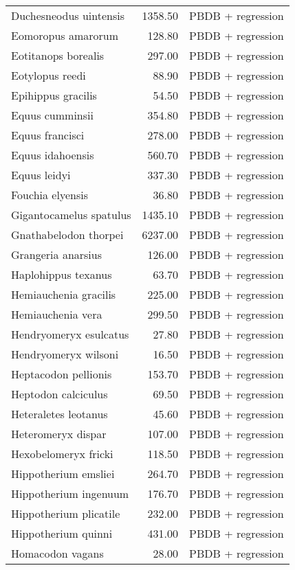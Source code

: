 \begin{table}[ht]
\begin{tabular}{lrl}
  Duchesneodus uintensis & 1358.50 & PBDB + regression \\ 
  Eomoropus amarorum & 128.80 & PBDB + regression \\ 
  Eotitanops borealis & 297.00 & PBDB + regression \\ 
  Eotylopus reedi & 88.90 & PBDB + regression \\ 
  Epihippus gracilis & 54.50 & PBDB + regression \\ 
  Equus cumminsii & 354.80 & PBDB + regression \\ 
  Equus francisci & 278.00 & PBDB + regression \\ 
  Equus idahoensis & 560.70 & PBDB + regression \\ 
  Equus leidyi & 337.30 & PBDB + regression \\ 
  Fouchia elyensis & 36.80 & PBDB + regression \\ 
  Gigantocamelus spatulus & 1435.10 & PBDB + regression \\ 
  Gnathabelodon thorpei & 6237.00 & PBDB + regression \\ 
  Grangeria anarsius & 126.00 & PBDB + regression \\ 
  Haplohippus texanus & 63.70 & PBDB + regression \\ 
  Hemiauchenia gracilis & 225.00 & PBDB + regression \\ 
  Hemiauchenia vera & 299.50 & PBDB + regression \\ 
  Hendryomeryx esulcatus & 27.80 & PBDB + regression \\ 
  Hendryomeryx wilsoni & 16.50 & PBDB + regression \\ 
  Heptacodon pellionis & 153.70 & PBDB + regression \\ 
  Heptodon calciculus & 69.50 & PBDB + regression \\ 
  Heteraletes leotanus & 45.60 & PBDB + regression \\ 
  Heteromeryx dispar & 107.00 & PBDB + regression \\ 
  Hexobelomeryx fricki & 118.50 & PBDB + regression \\ 
  Hippotherium emsliei & 264.70 & PBDB + regression \\ 
  Hippotherium ingenuum & 176.70 & PBDB + regression \\ 
  Hippotherium plicatile & 232.00 & PBDB + regression \\ 
  Hippotherium quinni & 431.00 & PBDB + regression \\ 
  Homacodon vagans & 28.00 & PBDB + regression \\ 

\end{tabular}
\end{table}
